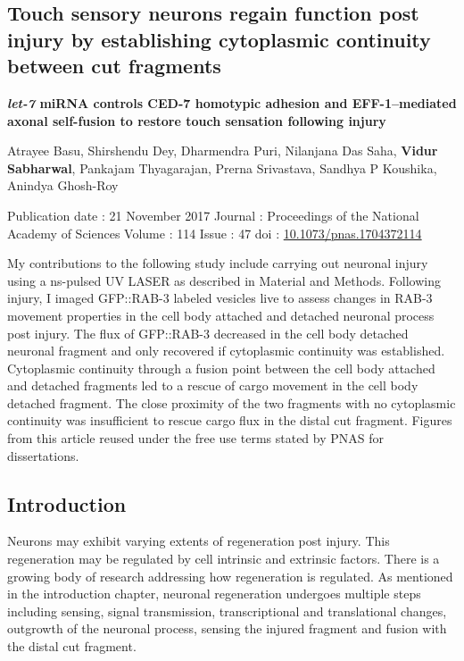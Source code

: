 \begin{appendices}
\chapter{Touch sensory neurons regain function post injury by establishing cytoplasmic continuity between cut fragments}


\large \textbf{\textit{let-7} miRNA controls CED-7 homotypic adhesion and EFF-1–mediated axonal self-fusion to restore touch sensation following injury}

\small
Atrayee Basu, Shirshendu Dey, Dharmendra Puri, Nilanjana Das Saha, \textbf{Vidur Sabharwal}, Pankajam Thyagarajan, Prerna Srivastava, Sandhya P Koushika, Anindya Ghosh-Roy

Publication date : 21 November 2017
Journal : Proceedings of the National Academy of Sciences
Volume : 114
Issue : 47
doi : \href{https://doi.org/10.1073/pnas.1704372114}{10.1073/pnas.1704372114}

\normalsize
My contributions to the following study include carrying out neuronal injury using a ns-pulsed UV LASER as described in Material and Methods. Following injury, I imaged GFP::RAB-3 labeled vesicles live to assess changes in RAB-3 movement properties in the cell body attached and detached neuronal process post injury. The flux of GFP::RAB-3 decreased in the cell body detached neuronal fragment and only recovered if cytoplasmic continuity was established. Cytoplasmic continuity through a fusion point between the cell body attached and detached fragments led to a rescue of cargo movement in the cell body detached fragment. The close proximity of the two fragments with no cytoplasmic continuity was insufficient to rescue cargo flux in the distal cut fragment. Figures from this article reused under the free use terms stated by PNAS for dissertations.

\section{Introduction}

Neurons may exhibit varying extents of regeneration post injury. This regeneration may be regulated by cell intrinsic and extrinsic factors. There is a growing body of research addressing how regeneration is regulated. As mentioned in the introduction chapter, neuronal regeneration undergoes multiple steps including sensing, signal transmission, transcriptional and translational changes, outgrowth of the neuronal process, sensing the injured fragment and fusion with the distal cut fragment. 


\end{appendices}
